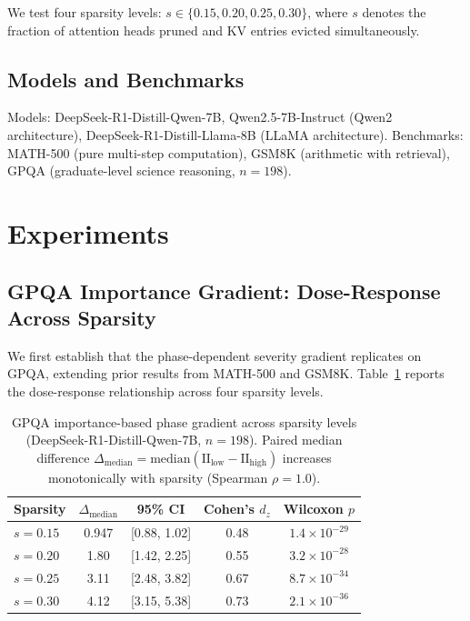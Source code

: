 \documentclass[11pt,a4paper]{article}
\begin{document}
We test four sparsity levels: $s \in \{0.15, 0.20, 0.25, 0.30\}$, where $s$ denotes the fraction of attention heads pruned and KV entries evicted simultaneously.

\subsection{Models and Benchmarks}

Models: DeepSeek-R1-Distill-Qwen-7B, Qwen2.5-7B-Instruct (Qwen2 architecture), DeepSeek-R1-Distill-Llama-8B (LLaMA architecture). Benchmarks: MATH-500 (pure multi-step computation), GSM8K (arithmetic with retrieval), GPQA (graduate-level science reasoning, $n=198$).

\section{Experiments}

\subsection{GPQA Importance Gradient: Dose-Response Across Sparsity}

We first establish that the phase-dependent severity gradient replicates on GPQA, extending prior results from MATH-500 and GSM8K. Table~\ref{tab:gpqa_dose_response} reports the dose-response relationship across four sparsity levels.

\begin{table}[h]
\centering
\caption{GPQA importance-based phase gradient across sparsity levels (DeepSeek-R1-Distill-Qwen-7B, $n=198$). Paired median difference $\Delta_{\text{median}} = \text{median}(\text{II}_{\text{low}} - \text{II}_{\text{high}})$ increases monotonically with sparsity (Spearman $\rho = 1.0$).}
\label{tab:gpqa_dose_response}
\begin{tabular}{lcccc}
\toprule
Sparsity & $\Delta_{\text{median}}$ & 95\% CI & Cohen's $d_z$ & Wilcoxon $p$ \\
\midrule
$s=0.15$ & 0.947 & [0.88, 1.02] & 0.48 & $1.4 \times 10^{-29}$ \\
$s=0.20$ & 1.80 & [1.42, 2.25] & 0.55 & $3.2 \times 10^{-28}$ \\
$s=0.25$ & 3.11 & [2.48, 3.82] & 0.67 & $8.7 \times 10^{-34}$ \\
$s=0.30$ & 4.12 & [3.15, 5.38] & 0.73 & $2.1 \times 10^{-36}$ \\
\bottomrule
\end{tabular}
\end{table}
\end{document}
